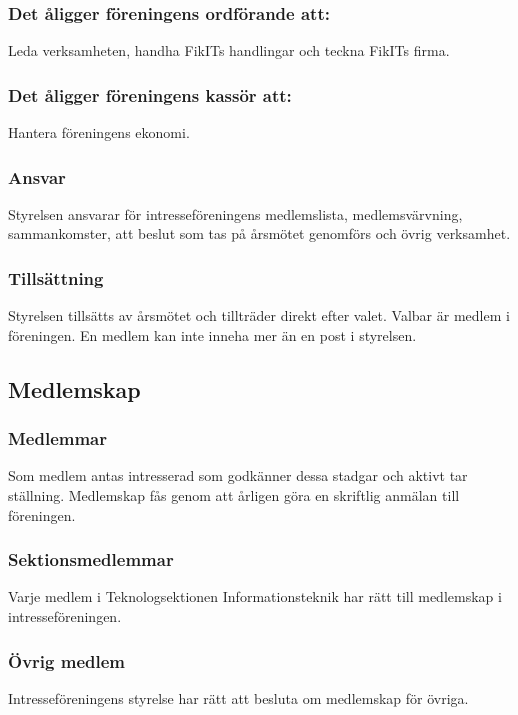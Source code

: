 \documentclass[11pt, noincludeaddress]{classes/cthit}
\begin{document}
\subsubsection{Det åligger föreningens ordförande att:}
Leda verksamheten, handha FikITs handlingar och teckna FikITs firma.

\subsubsection{Det åligger föreningens kassör att:}
Hantera föreningens ekonomi. 



\subsubsection{Ansvar}
Styrelsen ansvarar för intresseföreningens medlemslista, medlemsvärvning, sammankomster, att beslut som tas på årsmötet genomförs och övrig verksamhet.

\subsubsection{Tillsättning}
Styrelsen tillsätts av årsmötet och tillträder direkt efter valet. Valbar är medlem i föreningen. En medlem kan inte inneha mer än en post i styrelsen.


\subsection{Medlemskap}

\subsubsection{Medlemmar}
Som medlem antas intresserad som godkänner dessa stadgar och aktivt tar ställning. Medlemskap fås genom att årligen göra en skriftlig anmälan till föreningen. 

\subsubsection{Sektionsmedlemmar}
Varje medlem i Teknologsektionen Informationsteknik har rätt till medlemskap i intresseföreningen.

\subsubsection{Övrig medlem}
Intresseföreningens styrelse har rätt att besluta om medlemskap för övriga.
\end{document}

